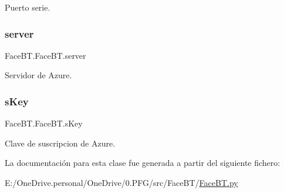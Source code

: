 Puerto serie. 

\mbox{\label{class_face_b_t_1_1_face_b_t_af768b1f81785e8008c14dca18114a0d6}} 
\subsubsection{\texorpdfstring{server}{server}}
{\footnotesize\ttfamily Face\+B\+T.\+Face\+B\+T.\+server}



Servidor de Azure. 

\mbox{\label{class_face_b_t_1_1_face_b_t_aa7cfb934d57a9f7b21d05ff5cedb95a1}} 
\subsubsection{\texorpdfstring{s\+Key}{sKey}}
{\footnotesize\ttfamily Face\+B\+T.\+Face\+B\+T.\+s\+Key}



Clave de suscripcion de Azure. 



La documentación para esta clase fue generada a partir del siguiente fichero\+:\begin{DoxyCompactItemize}
\item 
E\+:/\+One\+Drive.\+personal/\+One\+Drive/0.\+P\+F\+G/src/\+Face\+B\+T/\mbox{\hyperlink{_face_b_t_8py}{Face\+B\+T.\+py}}\end{DoxyCompactItemize}
